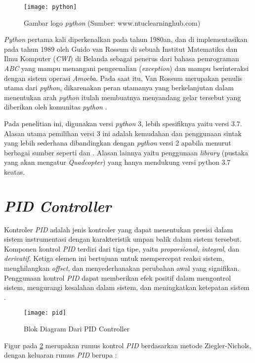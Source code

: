 \begin{figure}[H]
	\centering
	\texttt{[image: python]}
	\caption{Gambar logo \textit{python} (Sumber: www.ntuclearninghub.com)}
	\label{fig:python}
\end{figure}

\textit{Python} pertama kali diperkenalkan pada tahun 1980an, dan di implementasikan pada tahun 1989 oleh Guido van Rossum di sebuah Institut Matematika dan Ilmu Komputer (\textit{CWI}) di Belanda sebagai penerus dari bahasa pemrograman \textit{ABC} yang mampu menangani pengecualian (\textit{exception}) dan mampu berinteraksi dengan sistem operasi \textit{Amoeba}. Pada saat itu, Van Rossum merupakan penulis utama dari \textit{python}, dikarenakan peran utamanya yang berkelanjutan dalam menentukan arah \textit{python} itulah membuatnya menyandang gelar tersebut yang diberikan oleh komunitas \textit{python} \citep{tulchak}.

Pada penelitian ini, digunakan versi \textit{python} 3, lebih spesifiknya yaitu versi 3.7. Alasan utama pemilihan versi 3 ini adalah kemudahan dan penggunaan sintak yang lebih sederhana dibandingkan dengan \textit{python} versi 2 apabila menurut berbagai sumber seperti \citep{diffpy} dan \citep{diffpy2}. Alasan lainnya yaitu penggunaan \textit{library} (pustaka yang akan mengatur \textit{Quadcopter}) yang hanya mendukung versi python 3.7 keatas.

\section{\textit{PID Controller}}
Kontroler \textit{PID} adalah jenis kontroler yang dapat menentukan presisi dalam sistem instrumentasi dengan karakteristik umpan balik dalam sistem tersebut. Komponen kontrol \textit{PID} terdiri dari tiga tipe, yaitu \textit{proporsional}, \textit{integral}, dan \textit{derivatif}. Ketiga elemen ini bertujuan untuk mempercepat reaksi sistem, menghilangkan \textit{offset}, dan menyederhanakan perubahan awal yang signifikan. Penggunaan kontrol \textit{PID} dapat memberikan efek positif dalam mengontrol sistem, mengurangi kesalahan dalam sistem, dan meningkatkan ketepatan sistem \citep{setyawan2015sistem}.

\begin{figure}[H]
	\centering
	\texttt{[image: pid]}
	\caption{Blok Diagram Dari PID Controller}
	\label{fig:pid}
\end{figure}

Figur pada \cref{fig:pid} merupakan rumus kontrol \textit{PID} berdasarkan metode Ziegler-Nichols, dengan keluaran rumus \textit{PID} berupa \citep{jamal2015implementasi}: 

